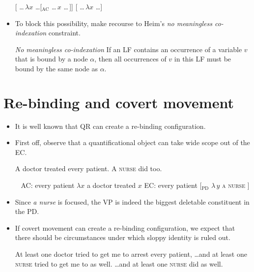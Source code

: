 \documentclass[nofonts,nobib]{tufte-handout}
\begin{document}
\begin{itemize}
    \pex
    \a\label{circ}[ \ldots\,\(λ x\) \ldots [\(_{\text{AC}}\) \ldots\,\(x\) \ldots\,]]
    \a\label{circ2}[ \ldots\,\(λ x\) \ldots {}]
    \xe
    
  \item To block this possibility, \citeauthor{fox_maxelide_2005} make recourse to Heim's \emph{no meaningless co-indexation} constraint. 
    
\ex
    \label{meaningless}\emph{No meaningless co-indexation}\newline
    If an LF contains an occurrence of a variable \(v\) that is bound by a node \(α\), then all occurrences of \(v\) in this LF must be bound by the same node as \(α\).
\xe
    
\end{itemize}
    
\section{Re-binding and covert movement}
    
\begin{itemize}

  \item It is well known that QR can create a re-binding configuration.
    
  \item First off, observe that a quantificational object can take wide scope out of the EC.

    \ex
    \label{qr}A doctor treated every patient.\newline
    A \textsc{nurse} did  too.
    \xe
    
    \pex~\label{qr2}
    \a\label{qr2a} AC: every patient \( λ x \) a doctor treated \(x\)
    \a\label{qr2b} EC: every patient [\(_{\text{PD}}\) \(λ\,y\) \textsc{a nurse} ]
    \xe
    
  \item Since \emph{a nurse} is focused, the VP is indeed the biggest deletable constituent in the PD.
    
  \item If covert movement can create a re-binding configuration, we expect that there should be circumstances under which sloppy identity is ruled out. 
    
    \pex
    At least one doctor tried to get me to arrest every patient,
    \a \ldots and at least one \textsc{nurse} tried to get me to  as well.
    \a \ldots and at least one \textsc{nurse} did  as well.
    \xe
    
\end{itemize}
    
\end{document}
